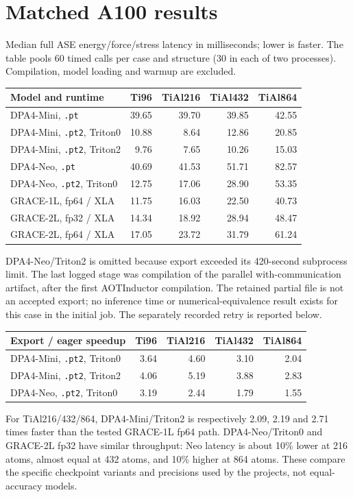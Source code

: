 \section*{Matched A100 results}
Median full ASE energy/force/stress latency in milliseconds; lower is faster.
The table pools 60 timed calls per case and structure (30 in each of two processes).
Compilation, model loading and warmup are excluded.
\begin{center}\small
\begin{tabular}{@{}lrrrr@{}}
\toprule
Model and runtime & Ti96 & TiAl216 & TiAl432 & TiAl864 \\
\midrule
DPA4-Mini, \texttt{.pt} & 39.65 & 39.70 & 39.85 & 42.55 \\
DPA4-Mini, \texttt{.pt2}, Triton0 & 10.88 & 8.64 & 12.86 & 20.85 \\
DPA4-Mini, \texttt{.pt2}, Triton2 & 9.76 & 7.65 & 10.26 & 15.03 \\
DPA4-Neo, \texttt{.pt} & 40.69 & 41.53 & 51.71 & 82.57 \\
DPA4-Neo, \texttt{.pt2}, Triton0 & 12.75 & 17.06 & 28.90 & 53.35 \\
GRACE-1L, fp64 / XLA & 11.75 & 16.03 & 22.50 & 40.73 \\
GRACE-2L, fp32 / XLA & 14.34 & 18.92 & 28.94 & 48.47 \\
GRACE-2L, fp64 / XLA & 17.05 & 23.72 & 31.79 & 61.24 \\
\bottomrule
\end{tabular}\end{center}
DPA4-Neo/Triton2 is omitted because export exceeded its 420-second subprocess limit.
The last logged stage was compilation of the parallel with-communication artifact,
after the first AOTInductor compilation. The retained partial file is not an accepted export;
no inference time or numerical-equivalence result exists for this case in the initial job.
The separately recorded retry is reported below.
\begin{center}\small
\begin{tabular}{@{}lrrrr@{}}
\toprule
Export / eager speedup & Ti96 & TiAl216 & TiAl432 & TiAl864 \\
\midrule
DPA4-Mini, \texttt{.pt2}, Triton0 & 3.64 & 4.60 & 3.10 & 2.04 \\
DPA4-Mini, \texttt{.pt2}, Triton2 & 4.06 & 5.19 & 3.88 & 2.83 \\
DPA4-Neo, \texttt{.pt2}, Triton0 & 3.19 & 2.44 & 1.79 & 1.55 \\
\bottomrule
\end{tabular}\end{center}
For TiAl216/432/864, DPA4-Mini/Triton2 is respectively 2.09, 2.19 and 2.71 times
faster than the tested GRACE-1L fp64 path. DPA4-Neo/Triton0 and GRACE-2L fp32
have similar throughput: Neo latency is about 10\% lower at 216 atoms, almost equal
at 432 atoms, and 10\% higher at 864 atoms. These compare the specific checkpoint
variants and precisions used by the projects, not equal-accuracy models.
